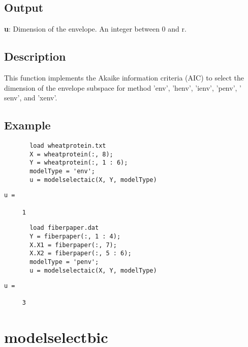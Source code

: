 \documentclass[a4paper,11pt,openany]{memoir}
\begin{document}
\subsection*{Output}

\begin{par}
\textbf{u}: Dimension of the envelope. An integer between 0 and r.
\end{par} \vspace{1em}


\subsection*{Description}

\begin{par}
This function implements the Akaike information criteria (AIC) to select the dimension of the envelope subspace for method 'env', 'henv', 'ienv', 'penv', ' senv', and 'xenv'.
\end{par} \vspace{1em}


\subsection*{Example}


\begin{verbatim}       load wheatprotein.txt
       X = wheatprotein(:, 8);
       Y = wheatprotein(:, 1 : 6);
       modelType = 'env';
       u = modelselectaic(X, Y, modelType)\end{verbatim}
\color{lightgray}\ttfamily\begin{verbatim}
u =

     1

\end{verbatim}  \rmfamily
\color{black}
\begin{verbatim}       load fiberpaper.dat
       Y = fiberpaper(:, 1 : 4);
       X.X1 = fiberpaper(:, 7);
       X.X2 = fiberpaper(:, 5 : 6);
       modelType = 'penv';
       u = modelselectaic(X, Y, modelType)\end{verbatim}
    

\color{lightgray}\ttfamily\begin{verbatim}
u =

     3

\end{verbatim} \rmfamily
\color{black}
    
\newpage


\rmfamily
\color{black}\section{modelselectbic}
\end{document}
